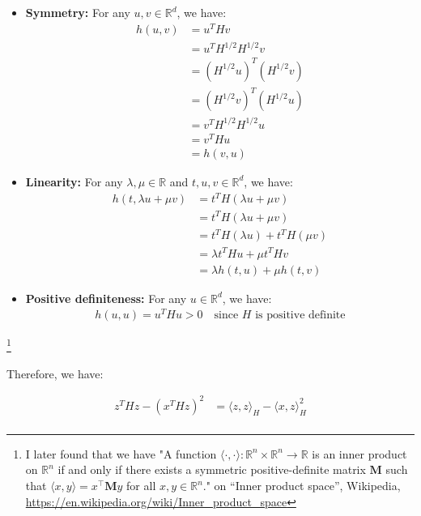 \documentclass{article}
\begin{document}
\begin{itemize}
    \item \textbf{Symmetry:} For any $u, v \in \mathbb{R}^d$, we have:
    \begin{align*}
        h(u, v) 
        &= u^T H v \\
        &= u^T H^{1/2} H^{1/2} v \\
        &= (H^{1/2} u)^T (H^{1/2} v) \\
        &= (H^{1/2} v)^T (H^{1/2} u) \\
        &= v^T H^{1/2} H^{1/2} u \\
        &= v^T H u \\
        &= h(v, u)
    \end{align*}
    \item \textbf{Linearity:} For any $\lambda, \mu \in \mathbb{R}$ and $t, u, v \in \mathbb{R}^d$, we have:
    \begin{align*}
        h(t, \lambda u + \mu v) 
        &= t^T H (\lambda u + \mu v) \\
        &= t^T H (\lambda u + \mu v) \\
        &= t^T H (\lambda u) + t^T H (\mu v) \\
        &= \lambda t^T H u + \mu t^T H v \\
        &= \lambda h(t, u) + \mu h(t, v)
    \end{align*}
    \item \textbf{Positive definiteness:} For any $u \in \mathbb{R}^d$, we have:
    \begin{align*}
        h(u, u) = u^T H u > 0 \quad \text{since $H$ is positive definite}
    \end{align*}
\end{itemize}
\footnote{I later found that we have 
"A function $\langle \cdot, \cdot \rangle : \mathbb{R}^n \times \mathbb{R}^n \to \mathbb{R}$ 
is an inner product on $\mathbb{R}^n$ if and only if there exists a symmetric positive-definite matrix $\mathbf{M}$ 
such that $\langle x, y \rangle = x^\top \mathbf{M} y$ for all $x, y \in \mathbb{R}^n$."
on ``Inner product space'', Wikipedia, \url{https://en.wikipedia.org/wiki/Inner_product_space}}

Therefore, we have:

\begin{align*}
    z^T H z - (x^T H z)^2 
    &= \langle z, z \rangle_H - \langle x, z \rangle_H^2 \\
\end{align*}
\end{document}
